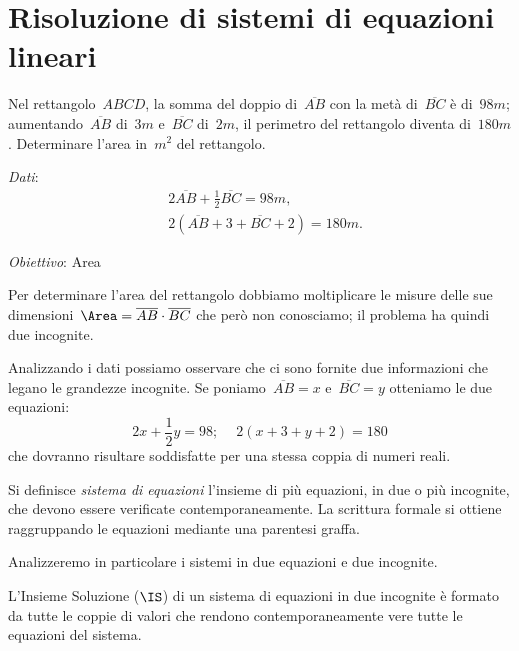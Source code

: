\section{Risoluzione di sistemi di equazioni lineari}
\begin{problema}
\label{pr:22.1}
Nel rettangolo~$ABCD$, la somma del doppio di~$\overline{AB}$ con la metà di~$\overline{BC}$ è
di~$98\unit{m}$; aumentando~$\overline{AB}$ di~$3\unit{m}$ e~$\overline{BC}$ di~$2\unit{m}$, il perimetro del rettangolo
diventa di~$180\unit{m}$. Determinare l'area in~$\unit{m}^{2}$ del rettangolo.
\end{problema}
\begin{multicols}{2}
\emph{Dati}:
\begin{align*}
&2\overline{AB}+\frac{1}{2}\overline{BC}=98\unit{m}\text{,}\\
&2(\overline{AB}+3+\overline{BC}+2)=180\unit{m}.
\end{align*}

\emph{Obiettivo}: Area

\begin{center}
 
\end{center}
\end{multicols}
 \begin{soluzione}
Per determinare l'area del rettangolo dobbiamo
moltiplicare le misure delle sue dimensioni~$\Area=\overline{AB}\cdot\overline{BC}$
che però non conosciamo; il problema ha quindi due incognite.

Analizzando i dati possiamo osservare che ci sono fornite due
informazioni che legano le grandezze incognite. Se poniamo~$\overline{AB}=x$ e~$\overline{BC}=y$
otteniamo le due equazioni:
\[2x+\frac{1}{2}y=98;\quad~2(x+3+y+2)=180\]
che dovranno risultare soddisfatte per una stessa coppia di numeri
reali.
 \end{soluzione}

 \begin{definizione}
Si definisce \emph{sistema di equazioni} l'insieme di più equazioni, in due o più incognite,
che devono essere verificate contemporaneamente. La scrittura formale
si ottiene raggruppando le equazioni mediante una parentesi graffa.
\end{definizione}

Analizzeremo in particolare i sistemi in due equazioni e due incognite.

\begin{definizione}
L'Insieme Soluzione ($\IS$) di un sistema di equazioni in
due incognite è formato da tutte le coppie di valori
che rendono contemporaneamente vere tutte le equazioni del sistema.
\end{definizione}

